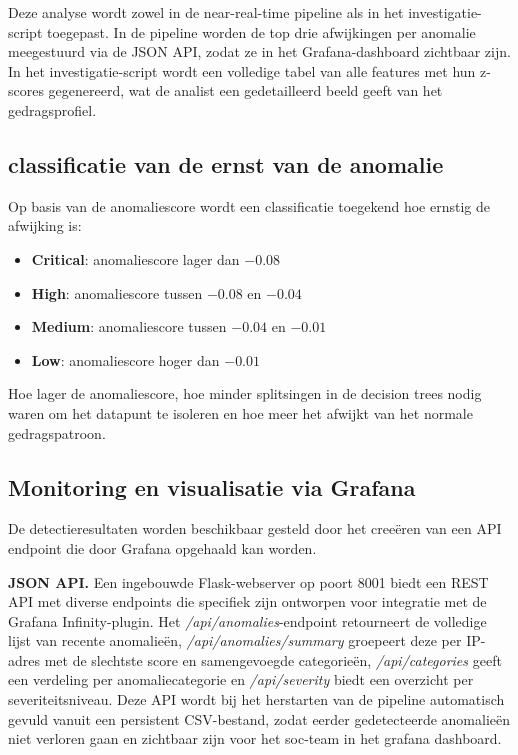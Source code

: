 Deze analyse wordt zowel in de near-real-time pipeline als in het investigatie-script toegepast. In de pipeline worden de top drie afwijkingen per anomalie meegestuurd via de JSON API, zodat ze in het Grafana-dashboard zichtbaar zijn. In het investigatie-script wordt een volledige tabel van alle features met hun z-scores gegenereerd, wat de analist een gedetailleerd beeld geeft van het gedragsprofiel.
 
\subsection{classificatie van de ernst van de anomalie} 
\label{subsec:severiteitsbepaling}

Op basis van de anomaliescore wordt een classificatie toegekend hoe ernstig de afwijking is:

\begin{itemize}
    \item \textbf{Critical}: anomaliescore lager dan $-0.08$
    \item \textbf{High}: anomaliescore tussen $-0.08$ en $-0.04$
    \item \textbf{Medium}: anomaliescore tussen $-0.04$ en $-0.01$
    \item \textbf{Low}: anomaliescore hoger dan $-0.01$
\end{itemize}

Hoe lager de anomaliescore, hoe minder splitsingen in de decision trees nodig waren om het datapunt te isoleren en hoe meer het afwijkt van het normale gedragspatroon.

\subsection{Monitoring en visualisatie via Grafana} 
\label{subsec:monitoring-grafana}

De detectieresultaten worden beschikbaar gesteld door het creeëren van een API endpoint die door Grafana opgehaald kan worden. 

\textbf{JSON API.} Een ingebouwde Flask-webserver op poort 8001 biedt een REST API met diverse endpoints die specifiek zijn ontworpen voor integratie met de Grafana Infinity-plugin. Het \textit{/api/anomalies}-endpoint retourneert de volledige lijst van recente anomalieën, \textit{/api/anomalies/summary} groepeert deze per IP-adres met de slechtste score en samengevoegde categorieën, \textit{/api/categories} geeft een verdeling per anomaliecategorie en \textit{/api/severity} biedt een overzicht per severiteitsniveau. Deze API wordt bij het herstarten van de pipeline automatisch gevuld vanuit een persistent CSV-bestand, zodat eerder gedetecteerde anomalieën niet verloren gaan en zichtbaar zijn voor het soc-team in het grafana dashboard.

